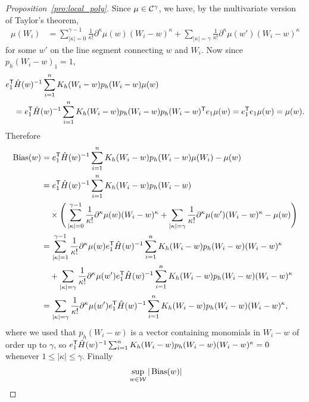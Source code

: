 \begin{proof}[Proposition~\ref{pro:local_poly}]
  Since $\mu \in \mathcal{C}^\gamma$, we have, by the multivariate version of Taylor's
  theorem,
  \begin{align*}
    \mu(W_i)
    &=
    \sum_{|\kappa|=0}^{\gamma-1}
    \frac{1}{\kappa!}
    \partial^{\kappa} \mu(w)
    (W_i-w)^\kappa
    + \sum_{|\kappa|=\gamma}
    \frac{1}{\kappa!}
    \partial^{\kappa} \mu(w')
    (W_i-w)^\kappa
  \end{align*}
  for some $w'$ on the line segment connecting
  $w$ and $W_i$.
  Now since $p_h(W_i-w)_1 = 1$,
  \begin{align*}
    &e_1^{\mathsf{T}} \hat H(w)^{-1}
    \sum_{i=1}^n K_h(W_i-w) p_h(W_i-w) \mu(w) \\
    &\quad=
    e_1^{\mathsf{T}} \hat H(w)^{-1}
    \sum_{i=1}^n K_h(W_i-w) p_h(W_i-w) p_h(W_i-w)^{\mathsf{T}} e_1 \mu(w)
    = e_1^{\mathsf{T}} e_1 \mu(w) = \mu(w).
  \end{align*}
  Therefore
  \begin{align*}
    \operatorname{Bias}(w)
    &=
    e_1^{\mathsf{T}} \hat H(w)^{-1}
    \sum_{i=1}^n K_h(W_i-w) p_h(W_i-w) \mu(W_i)
    - \mu(w) \\
    &=
    e_1^{\mathsf{T}} \hat H(w)^{-1}
    \sum_{i=1}^n K_h(W_i-w) p_h(W_i-w) \\
    &\quad\times
    \Bigg(
      \sum_{|\kappa|=0}^{\gamma-1}
      \frac{1}{\kappa!}
      \partial^{\kappa} \mu(w)
      (W_i-w)^\kappa
      + \sum_{|\kappa|=\gamma}
      \frac{1}{\kappa!}
      \partial^{\kappa} \mu(w')
      (W_i-w)^\kappa
      - \mu(w)
    \Bigg) \\
    &=
    \sum_{|\kappa|=1}^{\gamma-1}
    \frac{1}{\kappa!}
    \partial^{\kappa} \mu(w)
    e_1^{\mathsf{T}} \hat H(w)^{-1}
    \sum_{i=1}^n K_h(W_i-w) p_h(W_i-w)
    (W_i-w)^\kappa \\
    &\quad+
    \sum_{|\kappa|=\gamma}
    \frac{1}{\kappa!}
    \partial^{\kappa} \mu(w')
    e_1^{\mathsf{T}} \hat H(w)^{-1}
    \sum_{i=1}^n K_h(W_i-w) p_h(W_i-w)
    (W_i-w)^\kappa \\
    &=
    \sum_{|\kappa|=\gamma}
    \frac{1}{\kappa!}
    \partial^{\kappa} \mu(w')
    e_1^{\mathsf{T}} \hat H(w)^{-1}
    \sum_{i=1}^n K_h(W_i-w) p_h(W_i-w)
    (W_i-w)^\kappa,
  \end{align*}
  where we used that
  $p_h(W_i-w)$ is a vector containing monomials
  in $W_i-w$ of order up to $\gamma$, so
  $e_1^{\mathsf{T}} \hat H(w)^{-1}
  \sum_{i=1}^n K_h(W_i-w) p_h(W_i-w)
  (W_i-w)^\kappa = 0$
  whenever $1 \leq |\kappa| \leq \gamma$.
  Finally
  \begin{align*}
    &\sup_{w\in\cW}
    |\Bias(w)| \\

\end{align*}
\end{proof}
